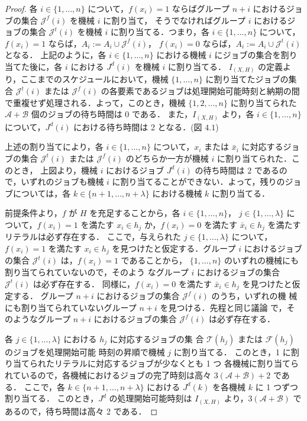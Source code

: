 \documentclass[12pt]{optlab-bachelor}
\begin{document}
\begin{proof}
  各 $i \in \{1,\ldots, n\}$ について，$f(x_i) = 1$ ならばグループ $n +
  i$ におけるジョブの集合 $\mathcal{J}^f(i)$ を機械 $i$ に割り当て，
  そうでなければグループ $i$ におけるジョブの集合 $\mathcal{J}^t(i)$ を機械 $i$ に割り当てる．つまり，各 $i \in \{1,\ldots, n\}$ について，
  $f(x_i) = 1$ ならば，$A_i := A_i \cup \mathcal{J}^f(i)$，
  $f(x_i) = 0$ ならば，$A_i := A_i \cup \mathcal{J}^t(i)$ となる．
  上記のように，各 $i \in \{1,\ldots, n\}$ における機械 $i$ にジョブの集合を割り当てた後に，各 $i$ における $J^d(i)$ を機械 $i$ に割り当てる．
  $I_{(X,H)}$ の定義より，ここまでのスケジュールにおいて，機械
  $\{1,\ldots, n\}$ に割り当てたジョブの集合 $\mathcal{J}^t(i)$ または $\mathcal{J}^f(i)$ の各要素であるジョブは処理開始可能時刻と納期の間で重複せず処理される．よって，このとき，機械 $\{1,2,\ldots,n\}$ に割り当てられた
  $\mathcal{A} + \mathcal{B}$ 個のジョブの待ち時間は $0$ である．
  また，$I_{(X,H)}$ より，各 $i \in \{1,\ldots, n\}$ について，$J^d(i)$ における待ち時間は 2 となる．(図 $4.1$)

  上述の割り当てにより，各 $i \in \{1,\ldots,n\}$ について，$x_i$ または
  $\bar x_i$ に対応するジョブの集合 $\mathcal{J}^t(i)$ または
  $\mathcal{J}^f(i)$ のどちらか一方が機械 $i$ に割り当てられた．このとき，
  上図より，機械 $i$ におけるジョブ $J^d(i)$ の待ち時間は $2$ であるので，いずれのジョブも機械 $i$ に割り当てることができない．よって，残りのジョブについては，各 $k \in \{n + 1,\ldots,n + \lambda\}$ における機械 $k$ に割り当てる．

  前提条件より，$f$ が $H$ を充足することから，各 $i \in \{1,\ldots,n\}$，
  $j \in \{1, \ldots, \lambda \}$ について，$f(x_i) = 1$ を満たす $x_i
  \in h_j$ か，$f(x_i) = 0$ を満たす $\bar x_i \in h_j$ を満たすリテラルは必ず存在する．
  ここで，与えられた $j \in \{1, \ldots, \lambda \}$ について，$f(x_i) =
  1$ を満たす $x_i \in h_j$ を見つけたと仮定する．グループ $i$ におけるジョブ
  の集合 $\mathcal{J}^t(i)$ は，$f(x_i) = 1$ であることから，
  $\{1,\ldots,n\}$ のいずれの機械にも割り当てられていないので，そのよう
  なグループ $i$ におけるジョブの集合 $\mathcal{J}^t(i)$ は必ず存在する．
  同様に，$f(x_i) = 0$ を満たす $\bar x_i \in h_j$ を見つけたと仮定する．
  グループ $n + i$ におけるジョブの集合 $\mathcal{J}^f(i)$ のうち，いずれの機
  械にも割り当てられていないグループ $n + i$ を見つける．先程と同じ議論
  で，そのようなグループ $n + i$ におけるジョブの集合 $\mathcal{J}^f(i)$ は必ず存在する．

  各 $j \in \{1, \ldots, \lambda \}$ における $h_j$ に対応するジョブの集
  合 $\mathcal{T}(h_j)$ または $\mathcal{F}(h_j)$ のジョブを処理開始可能
  時刻の昇順で機械 $j$ に割り当てる．
  このとき，1 に割り当てられたリテラルに対応するジョブが少なくとも 1 つ
  各機械に割り当てられているので，各機械におけるジョブの完了時刻は高々
  $3(\mathcal{A} + \mathcal{B}) + 2$ である．
  ここで，各 $k \in \{n + 1,\ldots,n + \lambda\}$ における $J^d(k)$ を各機械 $k$
  に 1 つずつ割り当てる．
  このとき，$J^d$ の処理開始可能時刻は $I_{(X,H)}$ より，$3(\mathcal{A}
  + \mathcal{B})$ であるので，待ち時間は高々 2 である．


\end{proof}
\end{document}
